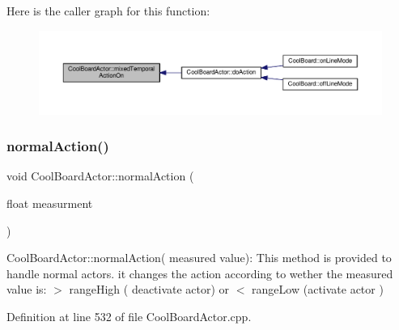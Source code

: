 Here is the caller graph for this function\+:\nopagebreak
\begin{figure}[H]
\begin{center}
\leavevmode
\includegraphics[width=350pt]{dc/d69/class_cool_board_actor_a216aa7a0cfd1f31d0025cc91c2ecd5dd_icgraph}
\end{center}
\end{figure}
\mbox{\label{class_cool_board_actor_a81229abf5895f4d3b0355050b822b438}} 
\subsubsection{\texorpdfstring{normal\+Action()}{normalAction()}}
{\footnotesize\ttfamily void Cool\+Board\+Actor\+::normal\+Action (\begin{DoxyParamCaption}\item[{float}]{measurment }\end{DoxyParamCaption})}

Cool\+Board\+Actor\+::normal\+Action( measured value)\+: This method is provided to handle normal actors. it changes the action according to wether the measured value is\+: $>$ range\+High ( deactivate actor) or $<$ range\+Low (activate actor ) 

Definition at line 532 of file Cool\+Board\+Actor.\+cpp.


